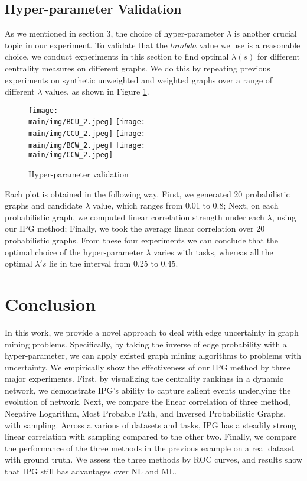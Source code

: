 \documentclass[\main/thesis.tex]{subfiles}
\begin{document}
\subsection{Hyper-parameter Validation} \label{Hyper-Parameter-Validation}
As we mentioned in section 3, the choice of hyper-parameter $\lambda$ is another crucial topic in our experiment. To validate that the $lambda$ value we use is a reasonable choice, we conduct experiments in this section to find optimal $\lambda (s)$ for different centrality measures on different graphs. We do this by repeating previous experiments on synthetic unweighted and weighted graphs over a range of different $\lambda$ values, as shown in Figure \ref{hyper}. \\

\begin{figure}
\texttt{[image: \\main/img/BCU\_2.jpeg]}
\texttt{[image: \\main/img/CCU\_2.jpeg]}
\texttt{[image: \\main/img/BCW\_2.jpeg]}
\texttt{[image: \\main/img/CCW\_2.jpeg]}
\caption{Hyper-parameter validation}
\label{hyper}
\end{figure}

Each plot is obtained in the following way. First, we generated 20 probabilistic graphs and candidate $\lambda$ value, which ranges from 0.01 to 0.8; Next, on each probabilistic graph, we computed linear correlation strength under each $\lambda$, using our IPG method; Finally, we took the average linear correlation over 20 probabilistic graphs. From these four experiments we can conclude that the optimal choice of the hyper-parameter $\lambda$ varies with tasks, whereas all the optimal $\lambda's$ lie in the interval from 0.25 to 0.45. 
\section{Conclusion}
In this work, we provide a novel approach to deal with edge uncertainty in graph mining problems. Specifically, by taking the inverse of edge probability with a hyper-parameter, we can apply existed graph mining algorithms to problems with uncertainty. We empirically show the effectiveness of our IPG method by three major experiments. First, by visualizing the centrality rankings in a dynamic network, we demonstrate IPG's ability to capture salient events underlying the evolution of network. Next, we compare the linear correlation of three method, Negative Logarithm, Most Probable Path, and Inversed Probabilistic Graphs, with sampling. Across a various of datasets and tasks, IPG has a steadily strong linear correlation with sampling compared to the other two. Finally, we compare the performance of the three methods in the previous example on a real dataset with ground truth. We assess the three methods by ROC curves, and results show that IPG still has advantages over NL and ML. 
\end{document}
